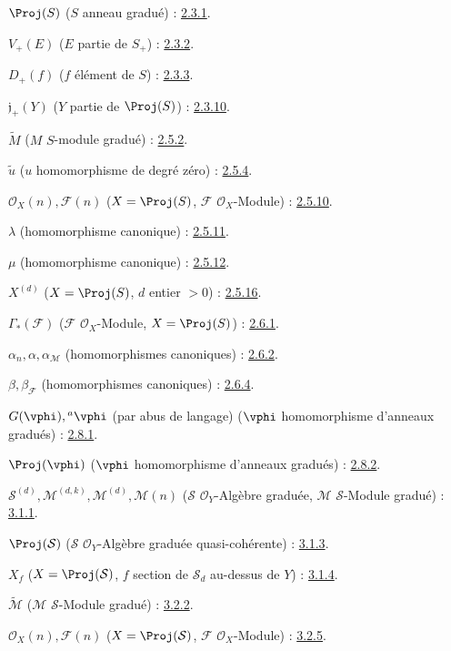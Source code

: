 $\Proj(S)$ ($S$ anneau gradué) : \hyperref[II.2.3.1-fr]{2.3.1}.

$V_+(E)$ ($E$ partie de $S_+$) : \hyperref[II.2.3.2-fr]{2.3.2}.

$D_+(f)$ ($f$ élément de $S$) : \hyperref[II.2.3.3-fr]{2.3.3}.

$\mathfrak j_+(Y)$ ($Y$ partie de $\Proj(S)$) : \hyperref[II.2.3.10-fr]{2.3.10}.

$\widetilde M$ ($M$ $S$-module gradué) : \hyperref[II.2.5.2-fr]{2.5.2}.

$\widetilde u$ ($u$ homomorphisme de degré zéro) : \hyperref[II.2.5.4-fr]{2.5.4}.

$\mathcal{O}_X(n),\mathcal{F}(n)$
($X=\Proj(S)$, $\mathcal{F}$ $\mathcal{O}_X$-Module) : \hyperref[II.2.5.10-fr]{2.5.10}.

$\lambda$ (homomorphisme canonique) : \hyperref[II.2.5.11-fr]{2.5.11}.

$\mu$ (homomorphisme canonique) : \hyperref[II.2.5.12-fr]{2.5.12}.

$X^{(d)}$ ($X=\Proj(S)$, $d$ entier $>0$) : \hyperref[II.2.5.16-fr]{2.5.16}.

$\Gamma_*(\mathcal{F})$ ($\mathcal{F}$ $\mathcal{O}_X$-Module,
$X=\Proj(S)$) : \hyperref[II.2.6.1-fr]{2.6.1}.

$\alpha_n,\alpha,\alpha_{\mathcal{M}}$ (homomorphismes canoniques) : \hyperref[II.2.6.2-fr]{2.6.2}.

$\beta,\beta_{\mathcal{F}}$ (homomorphismes canoniques) : \hyperref[II.2.6.4-fr]{2.6.4}.

$G(\vphi),{}^a\vphi$ (par abus de langage)
($\vphi$ homomorphisme d'anneaux gradués) : \hyperref[II.2.8.1-fr]{2.8.1}.

$\Proj(\vphi)$ ($\vphi$ homomorphisme d'anneaux gradués) : \hyperref[II.2.8.2-fr]{2.8.2}.

$\mathcal{S}^{(d)},\mathcal{M}^{(d,k)},\mathcal{M}^{(d)},\mathcal{M}(n)$
($\mathcal{S}$ $\mathcal{O}_Y$-Algèbre graduée,
$\mathcal{M}$ $\mathcal{S}$-Module gradué) : \hyperref[II.3.1.1-fr]{3.1.1}.

$\Proj(\mathcal{S})$ ($\mathcal{S}$ $\mathcal{O}_Y$-Algèbre graduée quasi-cohérente) : \hyperref[II.3.1.3-fr]{3.1.3}.

$X_f$ ($X=\Proj(\mathcal{S})$, $f$ section de $\mathcal{S}_d$ au-dessus de $Y$) : \hyperref[II.3.1.4-fr]{3.1.4}.

$\widetilde{\mathcal{M}}$ ($\mathcal{M}$ $\mathcal{S}$-Module gradué) : \hyperref[II.3.2.2-fr]{3.2.2}.

$\mathcal{O}_X(n),\mathcal{F}(n)$
($X=\Proj(\mathcal{S})$, $\mathcal{F}$ $\mathcal{O}_X$-Module) : \hyperref[II.3.2.5-fr]{3.2.5}.

